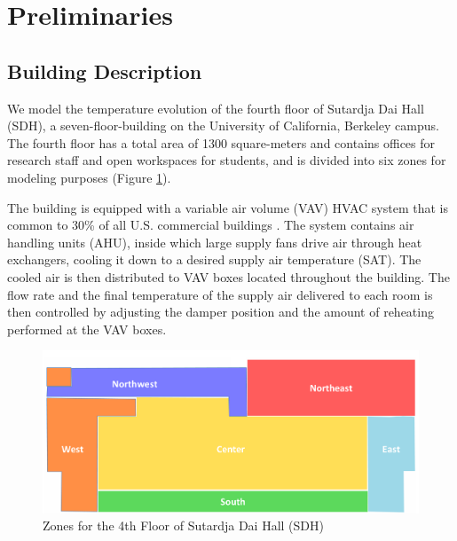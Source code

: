 
\section{Preliminaries}
\label{sec:Preliminaries}

\subsection{Building Description}\label{sec:testbed}
We model the temperature evolution of the fourth floor of Sutardja Dai Hall (SDH), a seven-floor-building on the University of California, Berkeley campus. 
The fourth floor has a total area of 1300 square-meters and contains offices for research staff and open workspaces for students, and is divided into six zones for modeling purposes (Figure \ref{fig:floor_plan}).

The building is equipped with a variable air volume (VAV) HVAC system that is common to 30\% of all U.S. commercial buildings \cite{VAV}. 
The system contains air handling units (AHU), inside which large supply fans drive air through heat exchangers, cooling it down to a desired supply air temperature (SAT). The cooled air is then distributed to VAV boxes located throughout the building. The flow rate and the final temperature of the supply air delivered to each room is then controlled by adjusting the damper position and the amount of reheating performed at the VAV boxes. 

\begin{figure}[hbtp]
\centering
\vspace*{0.5cm}
\includegraphics[width=\textwidth]{chapters/building_model/figures/FloorPlan.png}
\vspace*{-0.05cm}
\caption{Zones for the 4th Floor of Sutardja Dai Hall (SDH)}
\label{fig:floor_plan}
\vspace*{-0.45cm}
\end{figure}


